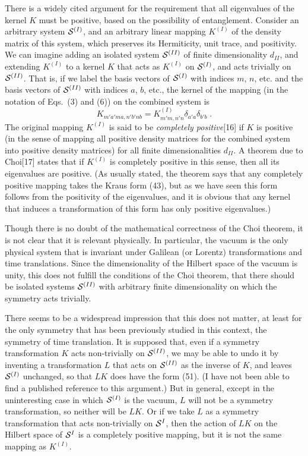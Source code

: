 There is a widely cited argument for the requirement that all eigenvalues of the kernel $K$ must be positive,  based on the possibility of entanglement.   Consider an arbitrary system ${\cal S}^{(I)}$, and an arbitrary linear mapping $K^{(I)}$ of the density matrix of this system, which preserves its Hermiticity,  unit trace, and positivity.  We can imagine adding an isolated system ${\cal S}^{(II)}$ of finite dimensionality $d_{II}$, and extending $K^{(I)}$ to a kernel $K$ that acts as $K^{(I)}$ on ${\cal S}^{(I)}$, and  acts trivially on ${\cal S}^{(II)}$.  That is, if we label the basis vectors of ${\cal S}^{(I)}$ with indices $m$, $n$, etc. and the 
basis vectors of ${\cal S}^{(II)}$ with indices $a$, $b$, etc.,
 the kernel of the mapping (in the notation of Eqs.~(3) and (6)) on the combined system is 
\begin{equation}
K_{m'a'ma,n'b'nb}=K^{(I)}_{m'm,n'n}\delta_{a'a}\delta_{b'b}\;.
\end{equation}
The original mapping $K^{(I)}$ is said to be {\em completely positive}[16] if $K$ is positive (in the sense of mapping all positive density matrices for the combined system into positive density matrices) for all finite dimensionalities $d_{II}$.  A theorem due to Choi[17] states that if $K^{(I)}$ is completely positive in this sense, then all its eigenvalues are positive.  (As usually stated, the theorem says that any completely positive mapping takes the Kraus form (43), but as we have seen this form follows from the positivity of the eigenvalues, and it is obvious that any kernel that induces a transformation of this form has only positive eigenvalues.)

Though there is no doubt of the mathematical correctness of the Choi theorem,  it is not clear that it is relevant physically.  In particular, the vacuum is the only physical system that is invariant under Galilean (or Lorentz) transformations and time translations.  Since the dimensionality of the Hilbert space of the vacuum is unity, this does not fulfill the conditions of the Choi theorem, that there should be isolated systems ${\cal S}^{(II)}$ with arbitrary finite dimensionality on which the symmetry acts trivially.  

There seems to be a widespread impression that this does not matter, at least for the only symmetry that has been previously studied in this context, the symmetry of time translation.  It is supposed that, even if a symmetry transformation $K$ acts non-trivially on ${\cal S}^{(II)}$, we may be able to undo it by inventing a transformation $L$ that acts on ${\cal S}^{(II)}$ as the inverse of $K$, and leaves ${\cal S}^{(I)}$ unchanged, so that $LK$ does have the form (51).  (I have not been able to find a published reference to this argument.)   But in general, except in the uninteresting case in which ${\cal S}^{(I)}$ is the vacuum, $L$ will not be a symmetry transformation, so neither will be $LK$.  Or if we take $L$ as a symmetry transformation that acts non-trivially on ${\cal S}^I$, then the action of $LK$ on the Hilbert space of ${\cal S}^I$ is a completely positive mapping, but it is not the same mapping as  $K^{(I)}$.

